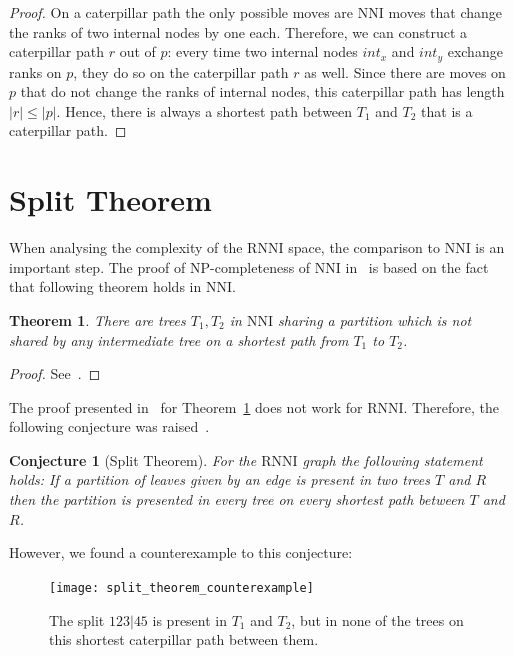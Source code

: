 \documentclass[11pt, a4paper]{article}
\newcommand{\nni}{\mathrm{NNI}}
\newcommand{\rnni}{\mathrm{RNNI}}
\newtheorem{theorem}[definition]{Theorem}
\newtheorem{conjecture}[definition]{Conjecture}
\begin{document}
\begin{proof}
	On a caterpillar path the only possible moves are $\nni$ moves that change the ranks of two internal nodes by one each.
	Therefore, we can construct a caterpillar path $r$ out of $p$:
	every time two internal nodes $int_x$ and $int_y$ exchange ranks on $p$, they do so on the caterpillar path $r$ as well.
	Since there are moves on $p$ that do not change the ranks of internal nodes, this caterpillar path has length $|r| \leq |p|$.
	Hence, there is always a shortest path between $T_1$ and $T_2$ that is a caterpillar path.
\end{proof}

\section{Split Theorem}

When analysing the complexity of the $\rnni$ space, the comparison to $\nni$ is an important step.
The proof of NP-completeness of $\nni$ in~\cite{jiang2000} is based on the fact that following theorem holds in $\nni$.

\begin{theorem}
	There are trees $T_1,T_2$ in $\nni$ sharing a partition which is not shared by any intermediate tree on a shortest path from $T_1$ to $T_2$.
	\label{thm:split_nni}
\end{theorem}

\begin{proof}
	See~\cite{Li1996}.
\end{proof}

The proof presented in~\cite{Li1996} for Theorem~\ref{thm:split_nni} does not work for $\rnni$. 
Therefore, the following conjecture was raised~\cite{Gavryushkin2017}.

\begin{conjecture}[Split Theorem]
	For the $\rnni$ graph the following statement holds:
	If a partition of leaves given by an edge is present in two trees $T$ and $R$ then the partition is presented in every tree on every shortest path between $T$ and $R$.
	\label{split_theorem}
\end{conjecture}

However, we found a counterexample to this conjecture:

\begin{figure}[H]
	\centering
	\texttt{[image: split\_theorem\_counterexample]}
	\caption{The split $123|45$ is present in $T_1$ and $T_2$, but in none of the trees on this shortest caterpillar path between them.}
	\label{split_theorem_counterexample}
\end{figure}
\end{document}
